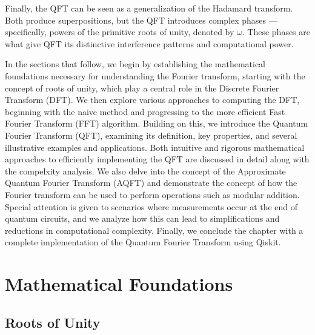 Finally, the QFT can be seen as a generalization of the Hadamard transform. Both produce superpositions, but the QFT introduces complex phases — specifically, powers of the primitive roots of unity, denoted by $\omega$. These phases are what give QFT its distinctive interference patterns and computational power.

In the sections that follow, we begin by establishing the mathematical foundations necessary for understanding the Fourier transform, starting with the concept of roots of unity, which play a central role in the Discrete Fourier Transform (DFT). We then explore various approaches to computing the DFT, beginning with the naive method and progressing to the more efficient Fast Fourier Transform (FFT) algorithm. Building on this, we introduce the Quantum Fourier Transform (QFT), examining its definition, key properties, and several illustrative examples and applications. Both intuitive and rigorous mathematical approaches to efficiently implementing the QFT are discussed in detail along with the compelxity analysis. We also delve into the concept of the Approximate Quantum Fourier Transform (AQFT) and demonstrate the concept of how the Fourier transform can be used to perform operations such as modular addition. Special attention is given to scenarios where measurements occur at the end of quantum circuits, and we analyze how this can lead to simplifications and reductions in computational complexity. Finally, we conclude the chapter with a complete implementation of the Quantum Fourier Transform using Qiskit.

\section{Mathematical Foundations}
\subsection{Roots of Unity}

